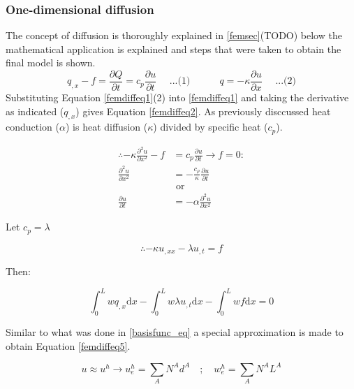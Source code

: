 	\subsubsection{One-dimensional diffusion}
The concept of diffusion is thoroughly explained in \ref{femsec}(TODO) below the mathematical application is explained and steps that were taken to obtain the final model is shown.
	\begin{equation}\label{femdiffeq1}
	q_{,x} - f = \frac{\partial Q}{\partial t} = c_{p}\frac{\partial u}{\partial t}\quad\text{  ...(1)} \quad\quad\quad q = -\kappa \frac{\partial u}{\partial x}\quad\text{  ...(2)}
\end{equation}
Substituting Equation \ref{femdiffeq1}(2) into \ref{femdiffeq1} and taking the derivative as indicated ($q_{,x}$) gives Equation \ref{femdiffeq2}. 
As previously disccussed heat conduction ($\alpha$) is heat diffusion ($\kappa$)  divided by specific heat ($c_p$).


\begin{equation}\label{femdiffeq2}
\begin{aligned}
\therefore -\kappa \frac{\partial^2 u}{\partial x^2} - f &= c_{p}\frac{\partial u}{\partial t} \rightarrow f=0:\\
\frac{\partial^2 u}{\partial x^2} &= - \frac{c_{\rho}}{\kappa} \frac{\partial u}{\partial t} \quad \\
&\text{ or } \\
\frac{\partial u}{\partial t} &= -\alpha \frac{\partial^2 u}{\partial x^2}
\end{aligned}
\end{equation}


Let $c_p = \lambda$ 

\begin{equation}\label{femdiffeq3}
\therefore -\kappa u_{,xx} - \lambda u_{,t} = f
\end{equation}


Then:

\begin{equation}\label{femdiffeq4}
\int_0^L w q_{,x} \text{d}x - \int_0^L w \lambda u_{,t} \text{d}x - \int_0^L w f \text{d}x = 0
\end{equation}


Similar to what was done in \ref{basisfunc_eq} a special approximation is made to obtain Equation \ref{femdiffeq5}.

\begin{equation}\label{femdiffeq5}
u \approx u^h \rightarrow u_e^h = \sum_{A}N^A d^A \quad;\quad w_e^h = \sum_{A}N^A L^A
\end{equation}


